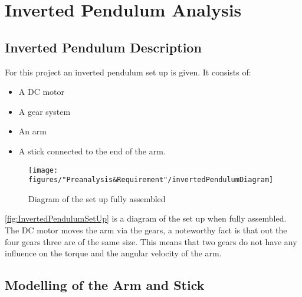 \chapter{Inverted Pendulum Analysis}


\section{Inverted Pendulum Description}
For this project an inverted pendulum set up is given. It consists of:
\begin{itemize}
	\item A DC motor
	\item A gear system
	\item An arm
	\item A stick connected to the end of the arm.
\end{itemize}

\begin{figure} [htbp]
	\centering
	\texttt{[image: figures/"Preanalysis\&Requirement"/invertedPendulumDiagram]}
	\caption{Diagram of the set up fully assembled} \label{fig:InvertedPendulumSetUp}
\end{figure}

\autoref{fig:InvertedPendulumSetUp} is a diagram of the set up when fully assembled. The DC motor moves the arm via the gears, a noteworthy fact is that out the four gears three are of the same size. This means that two gears do not have any influence on the torque and the angular velocity of the arm.




\section{Modelling of the Arm and Stick}\label{sec:StickArm}

